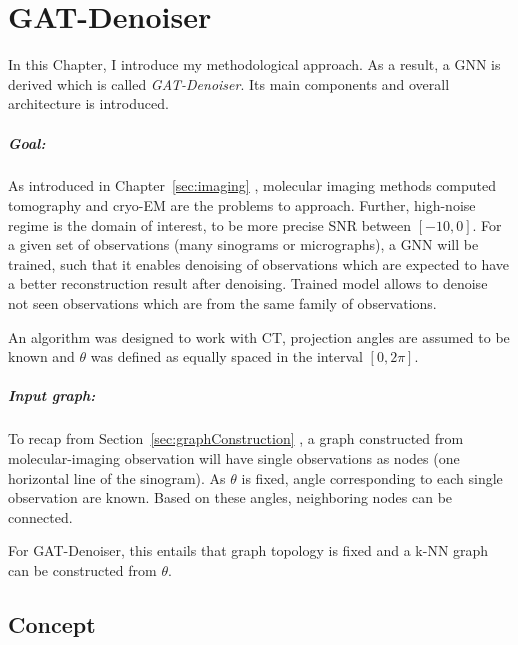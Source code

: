 \chapter{GAT-Denoiser}
\label{sec:contribution}

In this Chapter, I introduce my methodological approach.
As a result, a GNN is derived which is called \textit{GAT-Denoiser}.
Its main components and overall architecture is introduced.


\paragraph{Goal:}
As introduced in Chapter~\ref{sec:imaging} \textit{}, molecular imaging methods computed tomography and cryo-EM are the problems
to approach. Further, high-noise regime is the domain of interest, to be more precise SNR between $[-10, 0]$.
For a given set of observations (many sinograms or micrographs), a GNN will be trained, such that
it enables denoising of observations which are expected to have a better reconstruction result after denoising.
Trained model allows to denoise not seen observations which are from the same family of observations.


\begin{tcolorbox}[colback=red!5!white,colframe=red!75!black]
  An algorithm was designed to work with CT, projection angles are assumed to be known and $\theta$ was defined as equally spaced 
  in the interval $[0, 2 \pi]$. 
\end{tcolorbox}

\paragraph{Input graph:}
To recap from Section~\ref{sec:graphConstruction}  \textit{}, 
a graph constructed from molecular-imaging observation will have single observations as nodes (one horizontal line of the sinogram). 
As $\theta$ is fixed, angle corresponding to each single observation are known. 
Based on these angles, neighboring nodes can be connected.

\begin{tcolorbox}[colback=red!5!white,colframe=red!75!black]
  For GAT-Denoiser, this entails that graph topology is fixed and
  a k-NN graph can be constructed from $\theta$.
\end{tcolorbox}


\section{Concept}
\label{sec:concept}


